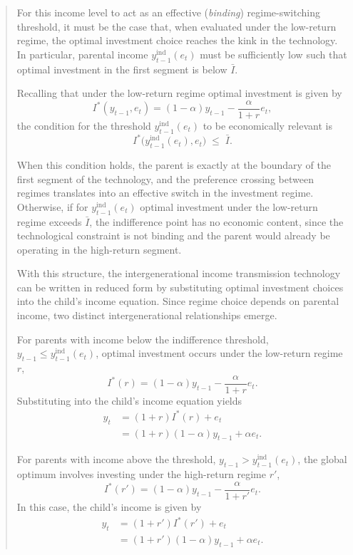 \documentclass[12pt]{article}
\begin{document}
\begin{abstract}
For this income level to act as an effective (\emph{binding}) regime-switching threshold, it must be the case that, when evaluated under the low-return regime, the optimal investment choice reaches the kink in the technology. In particular, parental income $y_{t-1}^{\text{ind}}(e_t)$ must be sufficiently low such that optimal investment in the first segment is below $\bar I$.

Recalling that under the low-return regime optimal investment is given by
\[
I^*(y_{t-1},e_t)
=
(1-\alpha)y_{t-1}-\frac{\alpha}{1+r}e_t,
\]
the condition for the threshold $y_{t-1}^{\text{ind}}(e_t)$ to be economically relevant is
\[
I^*\big(y_{t-1}^{\text{ind}}(e_t),e_t\big)\;\leq\;\bar I.
\]

When this condition holds, the parent is exactly at the boundary of the first segment of the technology, and the preference crossing between regimes translates into an effective switch in the investment regime. Otherwise, if for $y_{t-1}^{\text{ind}}(e_t)$ optimal investment under the low-return regime exceeds $\bar I$, the indifference point has no economic content, since the technological constraint is not binding and the parent would already be operating in the high-return segment.

With this structure, the intergenerational income transmission technology can be written in reduced form by substituting optimal investment choices into the child’s income equation. Since regime choice depends on parental income, two distinct intergenerational relationships emerge.

For parents with income below the indifference threshold,
\(y_{t-1} \leq y_{t-1}^{\text{ind}}(e_t)\),
optimal investment occurs under the low-return regime $r$,
\[
I^*(r)
=
(1-\alpha)y_{t-1}
-
\frac{\alpha}{1+r}e_t.
\]
Substituting into the child’s income equation yields
\[
\begin{aligned}
y_t
&=
(1+r)I^*(r)+e_t \\
&=
(1+r)(1-\alpha)y_{t-1}
+
\alpha e_t.
\end{aligned}
\]

For parents with income above the threshold,
\(y_{t-1} > y_{t-1}^{\text{ind}}(e_t)\),
the global optimum involves investing under the high-return regime $r'$,
\[
I^*(r')
=
(1-\alpha)y_{t-1}
-
\frac{\alpha}{1+r'}e_t.
\]
In this case, the child’s income is given by
\[
\begin{aligned}
y_t
&=
(1+r')I^*(r')+e_t \\
&=
(1+r')(1-\alpha)y_{t-1}
+
\alpha e_t.
\end{aligned}
\]


\end{abstract}
\end{document}
